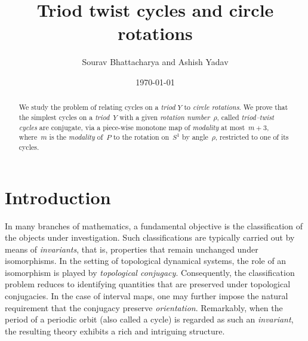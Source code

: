 \documentclass[12pt,reqno]{amsart}
\theoremstyle{definition}
\theoremstyle{remark}
\theoremstyle{assumption}
\numberwithin{equation}{section}
\begin{document}
	
	\date{\today}

\title[Triod twist cycles and circle rotations]{Triod twist cycles and circle rotations}


\author{Sourav Bhattacharya and Ashish Yadav}


\address[Dr. Sourav Bhattacharya and Ashish Yadav]
{Department of Mathematics, Visvesvaraya National Institute of Technology Nagpur,
	Nagpur, Maharashtra 440010,
	India}


\begin{abstract}
	
We study the problem of relating cycles on  a \emph{triod} $Y$ to \emph{circle rotations}.  We prove that the simplest cycles on a \emph{triod}~$Y$ with a given \emph{rotation number}~$\rho$, called \emph{triod--twist cycles} are conjugate, via a piece-wise monotone map of \emph{modality} at most~$m + 3$, where~$m$ is the \emph{modality} of~$P$  to the rotation on~$S^1$ by angle~$\rho$, restricted to one of its cycles.

	
	
	
\end{abstract}

	

	
	\maketitle

	
\section{Introduction}\label{intro}


In many branches of mathematics, a fundamental objective is the classification of the objects under investigation. Such classifications are typically carried out by means of \emph{invariants}, that is, properties that remain unchanged under isomorphisms. In the setting of topological dynamical systems, the role of an isomorphism is played by  \emph{topological conjugacy}. Consequently, the classification problem reduces to identifying quantities that are preserved under topological conjugacies. In the case of interval maps, one may further impose the natural requirement that the conjugacy preserve \emph{orientation}. Remarkably, when the period of a periodic orbit (also called a cycle) is regarded as such an \emph{invariant}, the resulting theory exhibits a rich and intriguing structure.
\end{document}
